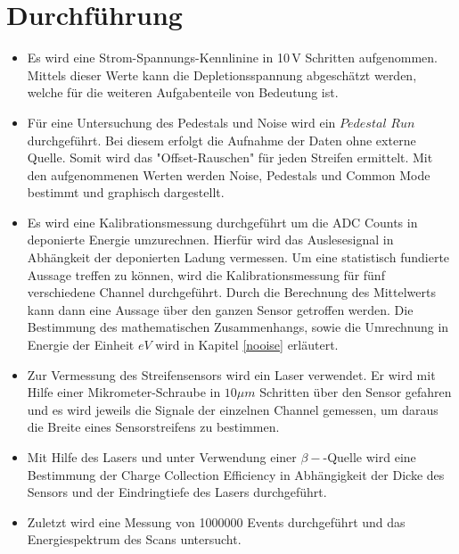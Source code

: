 \section{Durchführung}
\label{sec:Durchführung}
\begin{itemize}
\item
Es wird eine Strom-Spannungs-Kennlinine in 10$\,$V Schritten aufgenommen. Mittels dieser
Werte kann die Depletionsspannung abgeschätzt werden, welche für die
weiteren Aufgabenteile von Bedeutung ist.

\item Für eine Untersuchung des Pedestals und Noise wird ein
$Pedestal\,\, Run$ durchgeführt. Bei diesem erfolgt die Aufnahme der Daten ohne externe Quelle. Somit wird das "Offset-Rauschen" für jeden Streifen ermittelt. Mit den aufgenommenen Werten
werden Noise, Pedestals und Common Mode bestimmt und graphisch dargestellt.

\item Es wird eine Kalibrationsmessung durchgeführt um die ADC Counts
in deponierte Energie umzurechnen. Hierfür wird das Auslesesignal in Abhängkeit der deponierten Ladung vermessen. Um eine statistisch fundierte Aussage treffen zu können, wird die Kalibrationsmessung für fünf verschiedene Channel durchgeführt. Durch die Berechnung des Mittelwerts kann dann eine Aussage über den ganzen Sensor getroffen werden. Die Bestimmung des mathematischen Zusammenhangs, sowie die Umrechnung in Energie der Einheit $eV$ wird in Kapitel \ref{nooise} erläutert.


\item
Zur Vermessung des Streifensensors wird ein Laser verwendet. Er wird mit
Hilfe einer Mikrometer-Schraube in $10\mu m$ Schritten über den Sensor gefahren
und es wird jeweils die Signale der einzelnen Channel gemessen, um daraus
die Breite eines Sensorstreifens zu bestimmen.

\item Mit Hilfe des Lasers und unter Verwendung einer $\beta-$-Quelle wird eine Bestimmung der Charge Collection Efficiency in Abhängigkeit der Dicke des Sensors und der Eindringtiefe des Lasers durchgeführt.

\item Zuletzt wird eine Messung von 1000000 Events durchgeführt und das Energiespektrum
des Scans untersucht.
\end{itemize}
